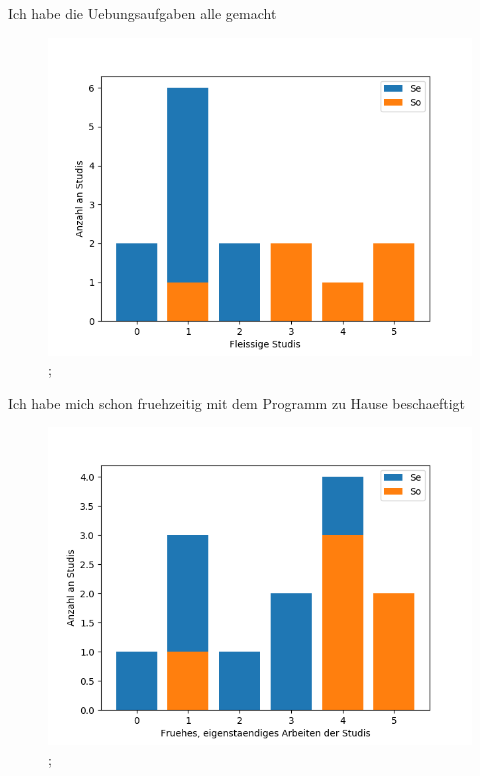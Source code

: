 \documentclass[10pt]{beamer}
\begin{document}
\begin{frame}[fragile]{Ich habe die Uebungsaufgaben alle gemacht} 
 \begin{figure}
 \includegraphics[width= 0.9\linewidth]{./PDFcreater/Plots/Nx/Ich+habe+die+Uebungsaufgaben+alle+gemacht.png};
 \end{figure}
 \end{frame}
\begin{frame}[fragile]{Ich habe mich schon fruehzeitig mit dem Programm zu Hause beschaeftigt} 
 \begin{figure}
 \includegraphics[width= 0.9\linewidth]{./PDFcreater/Plots/Nx/Ich+habe+mich+schon+fruehzeitig+mit+dem+Programm+zu+Hause+beschaeftigt.png};
 \end{figure}
 \end{frame}
\end{document}
